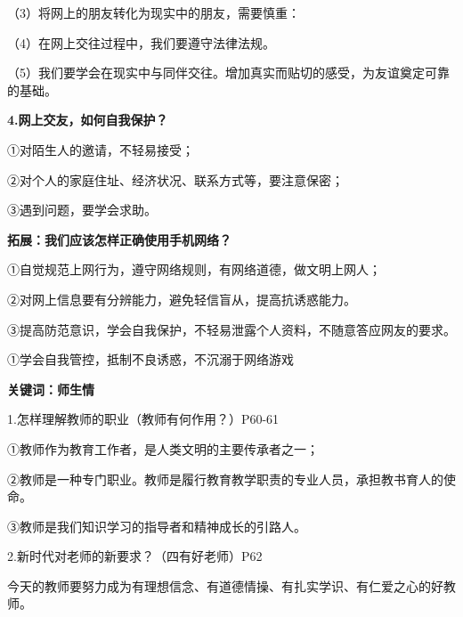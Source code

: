 \documentclass[lang=cn,11pt]{elegantbook}
\newcommand{\daofasym}[1]{{\daofasymbolfont #1}}
\newcommand{\daofasym}[1]{#1}
\begin{document}
（3）将网上的朋友转化为现实中的朋友，需要慎重：\par

（4）在网上交往过程中，我们要遵守法律法规。\par

（5）我们要学会在现实中与同伴交往。增加真实而贴切的感受，为友谊奠定可靠的基础。\par

\textbf{4.网上交友，如何自我保护？}\par

\daofasym{①}对陌生人的邀请，不轻易接受；\par

\daofasym{②}对个人的家庭住址、经济状况、联系方式等，要注意保密；\par

\daofasym{③}遇到问题，要学会求助。\par

\textbf{拓展：我们应该怎样正确使用手机网络？}\par

\daofasym{①}自觉规范上网行为，遵守网络规则，有网络道德，做文明上网人；\par

\daofasym{②}对网上信息要有分辨能力，避免轻信盲从，提高抗诱惑能力。\par

\daofasym{③}提高防范意识，学会自我保护，不轻易泄露个人资料，不随意答应网友的要求。\par

\daofasym{①}学会自我管控，抵制不良诱惑，不沉溺于网络游戏\par

\textbf{关键词：师生情}\par

1.怎样理解教师的职业（教师有何作用？）P60-61\par

\daofasym{①}教师作为教育工作者，是人类文明的主要传承者之一；\par

\daofasym{②}教师是一种专门职业。教师是履行教育教学职责的专业人员，承担教书育人的使命。\par

\daofasym{③}教师是我们知识学习的指导者和精神成长的引路人。\par

2.新时代对老师的新要求？（四有好老师）P62\par

今天的教师要努力成为有理想信念、有道德情操、有扎实学识、有仁爱之心的好教师。\par
\end{document}
